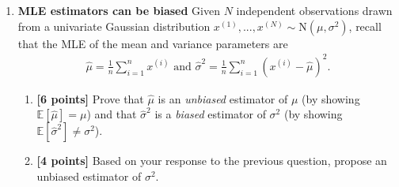 \begin{enumerate}
        \begin{tcolorbox}[fit,height=14cm, width=0.95\textwidth, blank, borderline={1pt}{-2pt}]
        \end{tcolorbox}
        
    \clearpage
    
    \item \textbf{MLE estimators can be biased} Given $N$ independent observations drawn from a univariate Gaussian distribution $x^{(1)}, ..., x^{(N)} \sim \text{N}(\mu, \sigma^2)$, recall that the MLE of the mean and variance parameters are
    \begin{align*}
        \widehat{\mu} = \frac{1}{n}\sum_{i=1}^{n} x^{(i)} \textrm{ and } \widehat{\sigma}^2 = \frac{1}{n} \sum_{i=1}^{n}(x^{(i)} - \widehat{\mu})^2.
    \end{align*}

    \begin{enumerate}
        \item \textbf{[6 points]} Prove that $\widehat{\mu}$ is an \emph{unbiased} estimator of $\mu$ (by showing $\mathbb{E}[\widehat{\mu}] = \mu$) and that $\widehat{\sigma}^2$ is a \emph{biased} estimator of $\sigma^2$ (by showing $\mathbb{E}[\widehat{\sigma}^2] \ne \sigma^2$).
        \begin{tcolorbox}[fit,height=10cm, width=0.85\textwidth, blank, borderline={1pt}{-2pt}]
        \end{tcolorbox}

        \item \textbf{[4 points]} Based on your response to the previous question, propose an unbiased estimator of $\sigma^2$.
        \begin{tcolorbox}[fit,height=4cm, width=0.85\textwidth, blank, borderline={1pt}{-2pt}]
        \end{tcolorbox}
    \end{enumerate}
\end{enumerate}